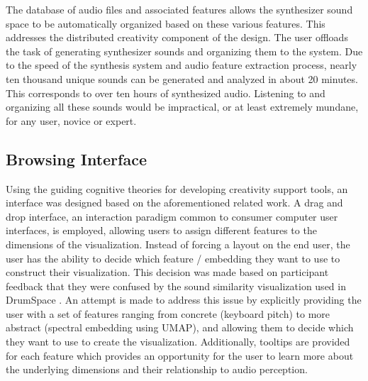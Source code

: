 The database of audio files and associated features allows the synthesizer sound space to be automatically organized based on these various features. This addresses the distributed creativity component of the design. The user offloads the task of generating synthesizer sounds and organizing them to the system. Due to the speed of the synthesis system and audio feature extraction process, nearly ten thousand unique sounds can be generated and analyzed in about 20 minutes. This corresponds to over ten hours of synthesized audio. Listening to and organizing all these sounds would be impractical, or at least extremely mundane, for any user, novice or expert. 

\subsection{Browsing Interface}

Using the guiding cognitive theories for developing creativity support tools, an interface was designed based on the aforementioned related work. A drag and drop interface, an interaction paradigm common to consumer computer user interfaces, is employed, allowing users to assign different features to the dimensions of the visualization. Instead of forcing a layout on the end user, the user has the ability to decide which feature / embedding they want to use to construct their visualization. This decision was made based on participant feedback that they were confused by the sound similarity visualization used in DrumSpace \cite{turquois2016exploring}. An attempt is made to address this issue by explicitly providing the user with a set of features ranging from concrete (keyboard pitch) to more abstract (spectral embedding using UMAP), and allowing them to decide which they want to use to create the visualization. Additionally, tooltips are provided for each feature which provides an opportunity for the user to learn more about the underlying dimensions and their relationship to audio perception.

